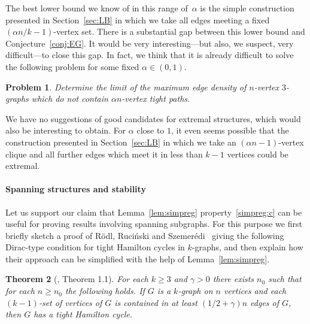 \documentclass[12pt,a4paper]{amsart}
\newtheorem{theorem}{Theorem}%
\newtheorem{problem}[theorem] {Problem}
\begin{document}
The best lower bound we know of in this
range of~$\alpha$ is the simple construction presented in Section~\ref{sec:LB} in which we take all edges
meeting a fixed $(\alpha n/k-1)$-vertex set. There is a substantial gap
between this lower bound and Conjecture~\ref{conj:EG}. 
It would be very interesting---but also, we suspect, very difficult---to
close this gap. In fact, we think that it is already difficult to solve the
following problem for some fixed $\alpha\in(0,1)$.

\begin{problem}
  Determine the limit of the maximum edge density of $n$-vertex $3$-graphs
  which do not contain $\alpha n$-vertex tight paths.
\end{problem}

We have no suggestions of good candidates for extremal structures, which
would also be interesting to obtain.  For $\alpha$ close to $1$, it even
seems possible that the construction presented in Section~\ref{sec:LB} in which we take an $(\alpha n-1)$-vertex clique and all further
edges which meet it in less than $k-1$ vertices could be extremal.

\smallskip

\paragraph{\bf Spanning structures and stability} 
Let us support our claim that Lemma~\ref{lem:simpreg} property~\ref{simpreg:c}
can be useful for proving results involving spanning subgraphs. For this
purpose we first briefly sketch a proof of R\"odl,
Ruci\'nski and Szemer\'edi~\cite{RRSHam} giving the following Dirac-type condition
for tight Hamilton cycles in $k$-graphs, and then explain how their
approach can be simplified with the help of Lemma~\ref{lem:simpreg}.

\begin{theorem}[\cite{RRSHam}, Theorem 1.1]\label{thm:rrsham}
  For each $k\ge 3$ and $\gamma>0$ there exists $n_0$ such that for each $n\ge
  n_0$ the following holds. If $G$ is a $k$-graph on $n$ vertices and each
  $(k-1)$-set of vertices of $G$ is contained in at least $(1/2+\gamma)n$ edges of $G$,
  then $G$ has a tight Hamilton cycle.
\end{theorem}
\end{document}
